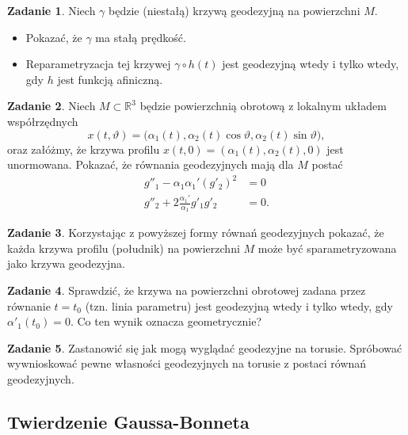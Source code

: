 \documentclass[a4paper,11pt]{article}
\theoremstyle{definition}\newtheorem{exercise}{Zadanie}
\theoremstyle{definition}\newtheorem{remark}{Uwaga}
\begin{document}
\begin{exercise}
Niech $\gamma$ będzie (niestałą) krzywą geodezyjną na powierzchni $M$. 
\begin{itemize}
 \item Pokazać, że $\gamma$ ma stałą prędkość.
 \item Reparametryzacja tej krzywej $\gamma\circ h (t)$ jest geodezyjną wtedy i 
tylko wtedy, gdy $h$ jest funkcją afiniczną. 
\end{itemize}

\end{exercise}

\begin{exercise}
Niech $M\subset \mathbb{R}^3$ będzie powierzchnią obrotową z lokalnym układem 
współrzędnych 
\[x(t,\vartheta)=\big(\alpha_1(t),\alpha_2(t)\cos \vartheta ,
\alpha_2(t)\sin\vartheta \big),\]
oraz załóżmy, że krzywa profilu $x(t,0)=(\alpha_1(t),\alpha_2(t),0)$ jest 
unormowana. Pokazać, że r\'ownania geodezyjnych mają dla $M$ postać
\begin{align*}
g''_1-\alpha_1\alpha_1'(g'_2)^2&=0\\
g''_2+2\frac{\alpha_1'}{\alpha_1}g'_1g'_2&=0.
\end{align*}
\end{exercise}

\begin{exercise}
Korzystając z powyższej formy r\'ownań geodezyjnych pokazać, że każda krzywa 
profilu (południk) na powierzchni $M$ może być sparametryzowana jako krzywa 
geodezyjna.
\end{exercise}

\begin{exercise}
Sprawdzić, że krzywa na powierzchni obrotowej zadana przez r\'ownanie 
$t=t_0$ (tzn. linia parametru) jest geodezyjną wtedy i tylko wtedy, gdy 
$\alpha'_1(t_0)=0$. Co ten wynik oznacza geometrycznie?

\end{exercise}

\begin{exercise}
 Zastanowić się jak mogą wyglądać geodezyjne na torusie. Spr\'obować 
wywnioskować pewne własności geodezyjnych na torusie z postaci r\'ownań 
geodezyjnych.
\end{exercise}


\subsection{Twierdzenie Gaussa-Bonneta}
\end{document}

